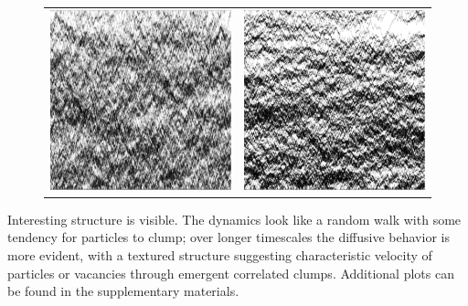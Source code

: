 \documentclass[
reprint, amsmath,amssymb,
]{revtex4-1}
\begin{document}
\begin{figure}[h!]
\begin{center}
\begin{tabular}{c | c}
    \hline
    \includegraphics[width=0.49\linewidth]{longTime} &\includegraphics[width=0.49\linewidth]{midLongTime}
    \end{tabular}
\end{center}
    \vspace{-0em}
\end{figure}

Interesting structure is visible. The dynamics look like a random walk with
some tendency for particles to clump; over longer timescales the
diffusive behavior is more evident, with a textured structure
suggesting characteristic velocity of particles or vacancies through
emergent correlated clumps.  Additional plots can be found in the
supplementary materials.
\end{document}
